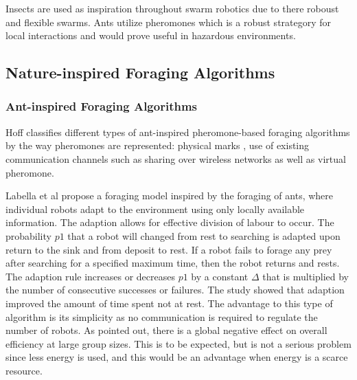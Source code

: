 
Insects are used as inspiration throughout swarm robotics due to there roboust and flexible swarms. Ants utilize pheromones which is a robust strategory for local interactions and would prove useful in hazardous environments. 
 
\subsection{Nature-inspired Foraging Algorithms}


\subsubsection{Ant-inspired Foraging Algorithms}
Hoff \cite{hoff2010two} classifies different types of ant-inspired pheromone-based foraging algorithms by the way pheromones are represented: physical marks \cite{alcoholfromants2012}, use of existing communication channels such as sharing over wireless networks as well as virtual pheromone. %

Labella et al \cite{labella2006division} propose a foraging model inspired by the foraging of ants, where individual robots adapt to the environment using only locally available information. The adaption allows for effective division of labour to occur. The probability $p1$ that a robot will changed from rest to searching is adapted upon return to the sink and from deposit to rest. If a robot fails to forage any prey after searching for a specified maximum time, then the robot returns and rests. 
The adaption rule increases or decreases $p1$ by a constant $\Delta$ that is multiplied by the number of consecutive successes or failures. The study showed that adaption improved the amount of time spent not at rest. The advantage to this type of algorithm is its simplicity as no communication is required to regulate the number of robots. As pointed out, there is a global negative effect on overall efficiency at large group sizes. This is to be expected, but is not a serious problem since less energy is used, and this would be an advantage when energy is a scarce resource. %

